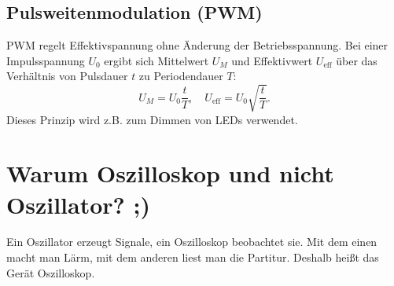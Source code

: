 \subsection{Pulsweitenmodulation (PWM)}
PWM regelt Effektivspannung ohne Änderung der Betriebsspannung. Bei einer Impulsspannung $U_0$ ergibt sich Mittelwert $U_M$ und Effektivwert $U_\text{eff}$ über das Verhältnis von Pulsdauer $t$ zu Periodendauer $T$:
\begin{equation}
U_M = U_0 \frac{t}{T}, \quad
U_\text{eff} = U_0 \sqrt{\frac{t}{T}}.
\end{equation}
Dieses Prinzip wird z.B. zum Dimmen von LEDs verwendet.

\section{Warum Oszilloskop und nicht Oszillator? ;)}
Ein Oszillator erzeugt Signale, ein Oszilloskop beobachtet sie. Mit dem einen macht man Lärm, mit dem anderen liest man die Partitur. Deshalb heißt das Gerät Oszilloskop.
